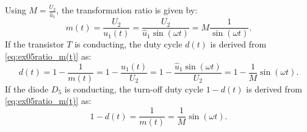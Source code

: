 \begin{solutionblock}
    Using $M = \frac{U_{\mathrm{2}}}{\hat u_{\mathrm{1}}}$, the transformation ratio is given by:
    \begin{equation}
        m(t) = \frac{U_{\mathrm{2}}}{ u_{\mathrm{1}}(t)}=\frac{U_{\mathrm{2}}}{\hat u_{\mathrm{1}} \sin(\omega t)} = M \frac{1}{\sin(\omega t)}.
    \end{equation}
   If the transistor $T$ is conducting, the duty cycle $d(t)$ is derived from \eqref{eq:ex05ratio_m(t)} as:
\begin{equation}
    d(t) = 1-\frac{1}{m(t)} = 1- \frac{u_{\mathrm{1}}(t)}{U_{\mathrm{2}}}=1- \frac{\hat u_{\mathrm{1}}\sin(\omega t)}{U_{\mathrm{2}}} = 1 -\frac{1}{M} \sin(\omega t).
\end{equation}
If the diode $D_{\mathrm{5}}$ is conducting, the turn-off duty cycle $1-d(t)$ is derived from \eqref{eq:ex05ratio_m(t)} as:
\begin{equation}
    1-d(t) = \frac{1}{m(t)}=\frac{1}{M} \sin(\omega t).
\end{equation}
\end{solutionblock}

